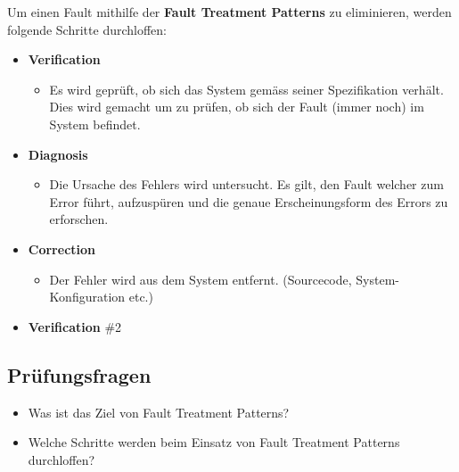 Um einen Fault mithilfe der \textbf{Fault Treatment Patterns} zu eliminieren, werden folgende Schritte durchloffen:
\begin{itemize}
	\item \textbf{Verification}
	\begin{itemize}
		\item Es wird geprüft, ob sich das System gemäss seiner Spezifikation verhält. Dies wird gemacht um zu prüfen, ob sich der Fault (immer noch) im System befindet.
	\end{itemize}
	\item \textbf{Diagnosis}
	\begin{itemize}
		\item Die Ursache des Fehlers wird untersucht. Es gilt, den Fault welcher zum Error führt, aufzuspüren und die genaue Erscheinungsform des Errors zu erforschen.
	\end{itemize}
	\item \textbf{Correction}
	\begin{itemize}
		\item Der Fehler wird aus dem System entfernt. (Sourcecode, System-Konfiguration etc.)
	\end{itemize}
	\item \textbf{Verification} \#2
\end{itemize}

\subsection*{Prüfungsfragen}

\begin{itemize}
	\item Was ist das Ziel von Fault Treatment Patterns?
	\item Welche Schritte werden beim Einsatz von Fault Treatment Patterns durchloffen?
\end{itemize}

